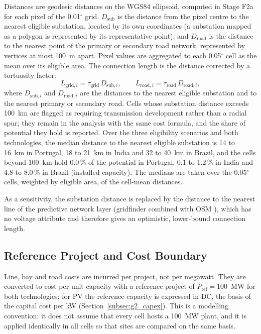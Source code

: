 Distances are geodesic distances on the WGS84 ellipsoid, computed in
Stage F2a for each pixel of the 0.01$^\circ$ grid. $D_{\mathrm{sub}}$ is the
distance from the pixel centre to the nearest eligible substation, located
by its own coordinates (a substation mapped as a polygon is represented by
its representative point), and $D_{\mathrm{road}}$ is the distance to the
nearest point of the primary or secondary road network, represented by
vertices at most 100~m apart.
Pixel values are aggregated to each 0.05$^\circ$ cell as the mean over its
eligible area.
The connection length is the distance corrected by a tortuosity factor:
\begin{equation}
    L_{\mathrm{grid},i} = \tau_{\mathrm{grid}}\, D_{\mathrm{sub},i},
    \qquad
    L_{\mathrm{road},i} = \tau_{\mathrm{road}}\, D_{\mathrm{road},i},
    \label{eq:g3_lengths}
\end{equation}
where $D_{\mathrm{sub},i}$ and $D_{\mathrm{road},i}$ are the distances to
the nearest eligible substation and to the nearest primary or secondary
road. Cells whose substation distance exceeds 100~km are flagged as
requiring transmission development rather than a radial spur; they remain
in the analysis with the same cost formula, and the share of potential
they hold is reported. Over the three eligibility scenarios and both
technologies, the median distance to the nearest eligible substation is
14 to 16~km in Portugal, 18 to 21~km in India and 32 to 40~km in Brazil,
and the cells beyond 100~km hold 0.0\,\% of the potential in Portugal,
0.1 to 1.2\,\% in India and 4.8 to 8.0\,\% in Brazil (installed
capacity). The medians are taken over the 0.05$^\circ$ cells, weighted by
eligible area, of the cell-mean distances.

As a sensitivity, the substation distance is replaced by the distance to
the nearest line of the predictive network layer (gridfinder combined
with OSM \cite{arderne2020}), which has no voltage attribute and
therefore gives an optimistic, lower-bound connection length.

\subsection{Reference Project and Cost Boundary}
\label{subsec:g3_boundary}

Line, bay and road costs are incurred per project, not per megawatt.
They are converted to cost per unit capacity with a reference project of
$P_{\mathrm{ref}}=100$~MW for both technologies; for PV the reference
capacity is expressed in DC, the basis of the capital cost per kW
(Section~\ref{subsec:g2_capex}). This is a modelling
convention: it does not assume that every cell hosts a 100~MW plant, and
it is applied identically in all cells so that sites are compared on the
same basis.

